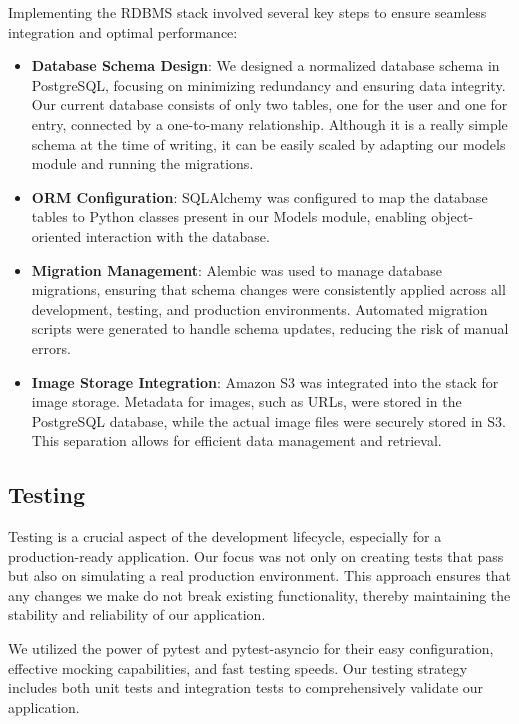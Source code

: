 Implementing the RDBMS stack involved several key steps to ensure seamless integration and optimal performance:

\begin{itemize}
    \item \textbf{Database Schema Design}: We designed a normalized database schema in PostgreSQL, focusing on minimizing redundancy and ensuring data integrity. Our current database consists of only two tables, one for the user and one for entry, connected by a one-to-many relationship. Although it is a really simple schema at the time of writing, it can be easily scaled by adapting our models module and running the migrations.
    \item \textbf{ORM Configuration}: SQLAlchemy was configured to map the database tables to Python classes present in our Models module, enabling object-oriented interaction with the database.
    \item \textbf{Migration Management}: Alembic was used to manage database migrations, ensuring that schema changes were consistently applied across all development, testing, and production environments. Automated migration scripts were generated to handle schema updates, reducing the risk of manual errors.
    \item \textbf{Image Storage Integration}: Amazon S3 was integrated into the stack for image storage. Metadata for images, such as URLs, were stored in the PostgreSQL database, while the actual image files were securely stored in S3. This separation allows for efficient data management and retrieval.
\end{itemize}

\subsection{Testing}
Testing is a crucial aspect of the development lifecycle, especially for a production-ready application. Our focus was not only on creating tests that pass but also on simulating a real production environment. This approach ensures that any changes we make do not break existing functionality, thereby maintaining the stability and reliability of our application.

We utilized the power of pytest \cite{pytest} and pytest-asyncio \cite{pytest_asyncio} for their easy configuration, effective mocking capabilities, and fast testing speeds. Our testing strategy includes both unit tests and integration tests to comprehensively validate our application.

